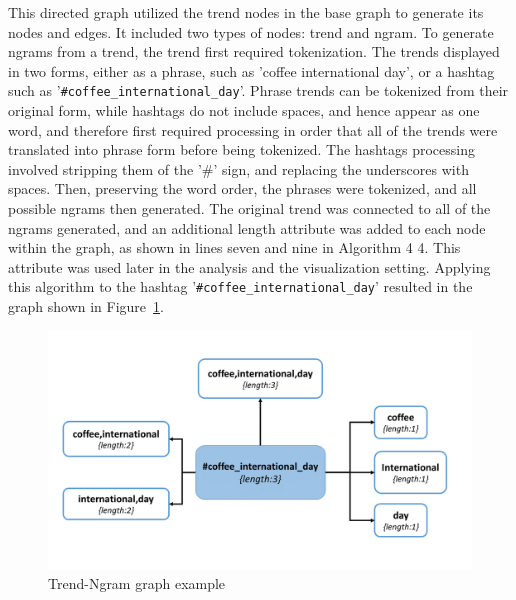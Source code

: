 \documentclass[conference]{IEEEtran}
\begin{document}
This directed graph utilized the trend nodes in the base graph to generate its nodes and 
edges. It included two types of nodes: trend and ngram. To generate ngrams from a 
trend, the trend first required tokenization. The trends displayed in two forms, either as 
a phrase, such as 'coffee international day', or a hashtag such as '{\texttt{\#coffee\_international\_day}}'. 
Phrase trends can be tokenized from their original form, while hashtags do not include spaces, 
and hence appear as one word, and therefore first required processing in order that all of the 
trends were translated into phrase form before being tokenized. The hashtags processing 
involved stripping them of the '\#' sign, and replacing the underscores with spaces. Then, 
preserving the word order, the phrases were tokenized, and all possible ngrams then generated. 
The original trend was connected to all of the ngrams generated, and an additional length attribute 
was added to each node within the graph, as shown in lines seven and nine in Algorithm ‎4 4. 
This attribute was used later in the analysis and the visualization setting. Applying this 
algorithm to the hashtag '{\texttt{\#coffee\_international\_day}}' resulted in the graph shown 
in Figure~\ref{fig:tngraph}.

\begin{figure}[htb] \centering
\includegraphics[width=\columnwidth]{images/trend_ngram_example.png}
\caption{Trend-Ngram graph example}
\label{fig:tngraph}
\end{figure}
\end{document}
